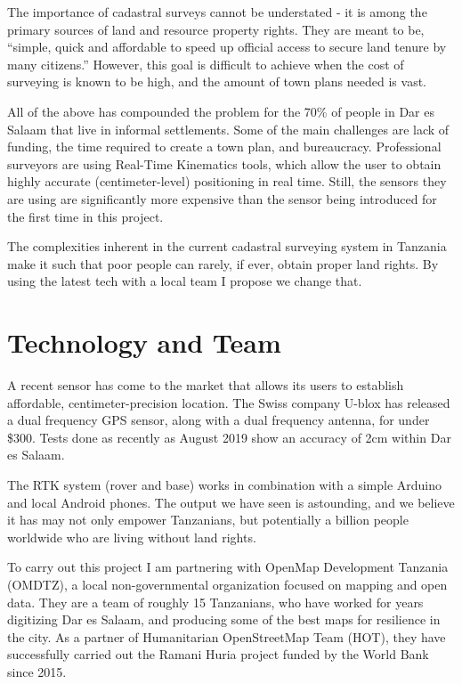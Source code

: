 \documentclass[a4paper,12pt,twoside]{article}
\begin{document}
The importance of cadastral surveys cannot be understated - it is among the primary sources of land and resource property rights. They are meant to be, “simple, quick and affordable to speed up official access to secure land tenure by many citizens.” However, this goal is difficult to achieve when the cost of surveying is known to be high, and the amount of town plans needed is vast. 
\bigskip

All of the above has compounded the problem for the 70\% of people in Dar es Salaam that live in informal settlements. Some of the main challenges are lack of funding, the time required to create a town plan, and bureaucracy. Professional surveyors are using Real-Time Kinematics tools, which allow the user to obtain highly accurate (centimeter-level) positioning in real time. Still, the sensors they are using are significantly more expensive than the sensor being introduced for the first time in this project. 
\bigskip

The complexities inherent in the current cadastral surveying system in Tanzania make it such that poor people can rarely, if ever, obtain proper land rights. By using the latest tech with a local team I propose we change that.  

\section{Technology and Team}

A recent sensor has come to the market that allows its users to establish affordable, centimeter-precision location. The Swiss company U-blox has released a dual frequency GPS sensor, along with a dual frequency antenna, for under \$300. Tests done as recently as August 2019 show an accuracy of 2cm within Dar es Salaam. 
\bigskip

The RTK system (rover and base) works in combination with a simple Arduino and local Android phones. The output we have seen is astounding, and we believe it has may not only empower Tanzanians, but potentially a billion people worldwide who are living without land rights. 
\bigskip

To carry out this project I am partnering with OpenMap Development Tanzania (OMDTZ), a local non-governmental organization focused on mapping and open data. They are a team of roughly 15 Tanzanians, who have worked for years digitizing Dar es Salaam, and producing some of the best maps for resilience in the city. As a partner of Humanitarian OpenStreetMap Team (HOT), they have successfully carried out the Ramani Huria project funded by the World Bank since 2015. 
\end{document}
